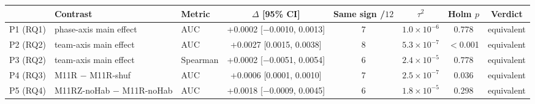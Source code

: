 
\begin{tabular}{@{}l l l c c c c c@{}}
\toprule
 & Contrast & Metric & $\Delta$ [95\% CI] & Same sign /$12$ & $\tau^2$ & Holm $p$ & Verdict \\
\midrule
P1 (RQ1) & phase-axis main effect & AUC & +0.0002 [$-$0.0010, 0.0013] & 7 & $1.0\!\times\!10^{-6}$ & 0.778 & equivalent \\
P2 (RQ2) & team-axis main effect & AUC & +0.0027 [0.0015, 0.0038] & 8 & $5.3\!\times\!10^{-7}$ & $<$0.001 & equivalent \\
P3 (RQ2) & team-axis main effect & Spearman & +0.0002 [$-$0.0051, 0.0054] & 6 & $2.4\!\times\!10^{-5}$ & 0.778 & equivalent \\
P4 (RQ3) & M11R $-$ M11R-shuf & AUC & +0.0006 [0.0001, 0.0010] & 7 & $2.5\!\times\!10^{-7}$ & 0.036 & equivalent \\
P5 (RQ4) & M11RZ-noHab $-$ M11R-noHab & AUC & +0.0018 [$-$0.0009, 0.0045] & 6 & $1.8\!\times\!10^{-5}$ & 0.298 & equivalent \\
\bottomrule
\end{tabular}
